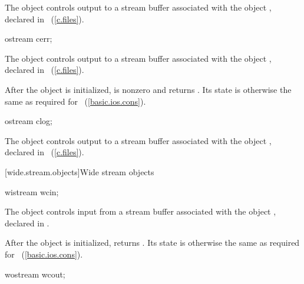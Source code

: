 \begin{itemdescr}
\pnum
The object
controls output to a stream buffer
associated with the object
,
declared in
%
~(\ref{c.files}).
\end{itemdescr}

%
\begin{itemdecl}
ostream cerr;
\end{itemdecl}

\begin{itemdescr}
\pnum
The object
controls output to a stream buffer
associated with the object
,
declared in
%
~(\ref{c.files}).

\pnum
After the object
is initialized,
is nonzero and  returns .
Its state is otherwise the same as required for
~(\ref{basic.ios.cons}).
\end{itemdescr}

%
\begin{itemdecl}
ostream clog;
\end{itemdecl}

\begin{itemdescr}
\pnum
The object
controls output to a stream buffer
associated with the object
,
declared in
%
~(\ref{c.files}).
\end{itemdescr}

[wide.stream.objects]{Wide stream objects}

%
\begin{itemdecl}
wistream wcin;
\end{itemdecl}

\begin{itemdescr}
\pnum
The object
controls input from a stream buffer
associated with the object
,
declared in
%
.

\pnum
After the object
is initialized,
returns
.
Its state is otherwise the same as required for
~(\ref{basic.ios.cons}).
\end{itemdescr}

%
\begin{itemdecl}
wostream wcout;
\end{itemdecl}

